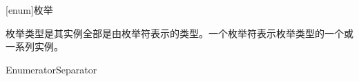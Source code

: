 
[enum]{枚举}

\pnum
枚举类型是其实例全部是由枚举符表示的类型。一个枚举符表示枚举类型的一个或一系列实例。

\begin{bnf}
 \br
     \terminal{\{} Enumerator\bnfl{}Separator \terminal{\}}
\end{bnf}
